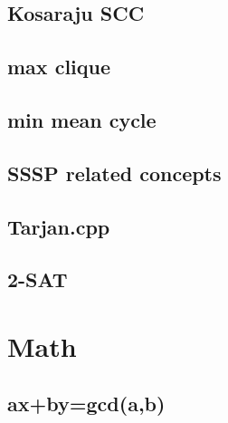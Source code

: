	\subsection{Kosaraju SCC}
		
%		
	\subsection{max clique}
		
	\subsection{min mean cycle}
		
%		
%		
	\subsection{SSSP related concepts}
		
	\subsection{Tarjan.cpp}
		
	\subsection{2-SAT}
		

\section{Math}
		
	\subsection{ax+by=gcd(a,b)}
		
%		
